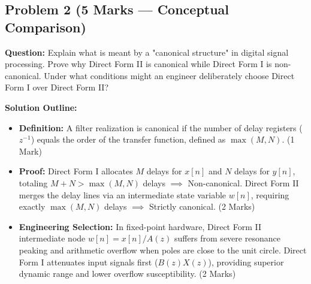 \documentclass[11pt,a4paper]{article}
\begin{document}
\subsection{Problem 2 (5 Marks — Conceptual Comparison)}
\textbf{Question:}
Explain what is meant by a "canonical structure" in digital signal processing. Prove why Direct Form II is canonical while Direct Form I is non-canonical. Under what conditions might an engineer deliberately choose Direct Form I over Direct Form II?

\vspace{0.2cm}
\noindent\textbf{Solution Outline:}
\begin{itemize}
    \item \textbf{Definition:} A filter realization is canonical if the number of delay registers ($z^{-1}$) equals the order of the transfer function, defined as $\max(M, N)$. (1 Mark)
    \item \textbf{Proof:} Direct Form I allocates $M$ delays for $x[n]$ and $N$ delays for $y[n]$, totaling $M+N > \max(M,N)$ delays $\implies$ Non-canonical. Direct Form II merges the delay lines via an intermediate state variable $w[n]$, requiring exactly $\max(M, N)$ delays $\implies$ Strictly canonical. (2 Marks)
    \item \textbf{Engineering Selection:} In fixed-point hardware, Direct Form II intermediate node $w[n] = x[n]/A(z)$ suffers from severe resonance peaking and arithmetic overflow when poles are close to the unit circle. Direct Form I attenuates input signals first ($B(z)X(z)$), providing superior dynamic range and lower overflow susceptibility. (2 Marks)
\end{itemize}
\end{document}
